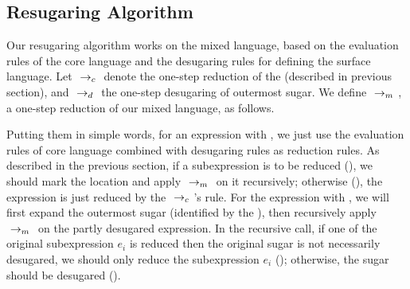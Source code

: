 \subsection{Resugaring Algorithm}

Our resugaring algorithm works on the mixed language, based on the evaluation rules of the core language and the desugaring rules for defining the surface language. Let $~\rightarrow_c~$ denote the one-step reduction of the  (described in previous section), and $~\rightarrow_d~$ the one-step desugaring of outermost sugar. We define $~\rightarrow_m~$, a one-step reduction of our mixed language, as follows.
\label{mark:mixedreduction}
{}
{}
{}
{
}

Putting them in simple words, for an expression with , we just use the evaluation rules of core language combined with desugaring rules as reduction rules. As described in the previous section, if a  subexpression is to be reduced (), we should mark the location and apply $~\rightarrow_m~$ on it recursively; otherwise (), the expression is just reduced by the $~\rightarrow_c~$'s rule.
For the expression with , we will first expand the outermost sugar (identified by the ), then recursively apply $~\rightarrow_m~$ on the partly desugared expression. In the recursive call, if one of the original subexpression $e_i$ is reduced then the original sugar is not necessarily desugared, we should only reduce the subexpression $e_i$ (); otherwise, the sugar should be desugared ().


